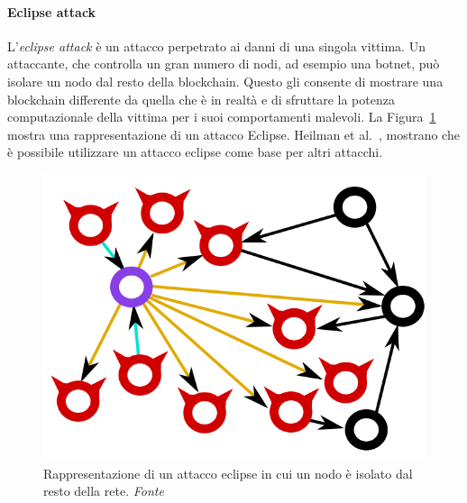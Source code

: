 \paragraph{Eclipse attack}
L'\emph{eclipse attack} è un attacco perpetrato ai danni di una singola vittima. Un attaccante, che controlla un gran numero di nodi, ad esempio una botnet, può isolare un nodo dal resto della blockchain. Questo gli consente di mostrare una blockchain differente da quella che è in realtà e di sfruttare la potenza computazionale della vittima per i suoi comportamenti malevoli. La Figura~\ref{fig:eclipse_attack} mostra una rappresentazione di un attacco Eclipse. Heilman et al.~\cite{heilman2015eclipse}, mostrano che è possibile utilizzare un attacco eclipse come base per altri attacchi.

\begin{figure}
	\centering
	\includegraphics[scale=0.3]{img/capuno/eclipse_attack.png}
	\caption{Rappresentazione di un attacco eclipse in cui un nodo è isolato dal resto della rete. \emph{Fonte~\cite{heilman2015eclipse}}}
	\label{fig:eclipse_attack}
\end{figure}

